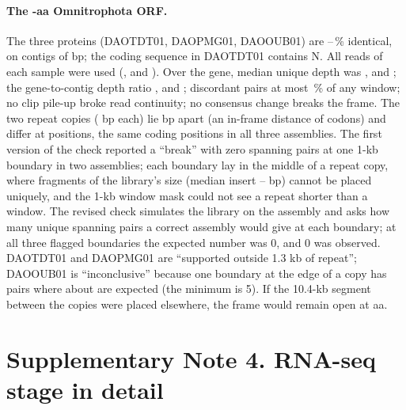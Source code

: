 \documentclass[11pt]{article}
\begin{document}
\paragraph{The -aa Omnitrophota ORF.} The three proteins (DAOTDT01, DAOPMG01, DAOOUB01) are
--\,\% identical, on contigs of  bp; the
coding sequence in DAOTDT01 contains  N. All reads of each sample were used (,
 and ). Over the gene, median unique depth was , 
and ; the gene-to-contig depth ratio ,  and ;
discordant pairs at most \,\% of any window; no clip pile-up broke read continuity; no consensus
change breaks the frame. The two repeat copies ( bp each) lie  bp apart (an in-frame
distance of  codons) and differ at  positions, the same coding positions in all three
assemblies. The first version of the check reported a ``break'' with zero spanning pairs at one 1-kb boundary in two
assemblies; each boundary lay in the middle of a repeat copy, where fragments of the library's size (median insert
-- bp) cannot be placed uniquely, and the 1-kb window mask could not see a repeat
shorter than a window. The revised check simulates the library on the assembly and asks how many unique spanning pairs a
correct assembly would give at each boundary; at all three flagged boundaries the expected number was 0, and 0 was observed.
DAOTDT01 and DAOPMG01 are ``supported outside 1.3 kb of repeat''; DAOOUB01 is ``inconclusive'' because one boundary at the
edge of a copy has  pairs where about  are expected (the minimum is 5). If the
10.4-kb segment between the copies were placed elsewhere, the frame would remain open at  aa.

\section*{Supplementary Note 4. RNA-seq stage in detail}
\end{document}
